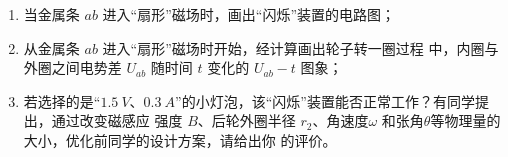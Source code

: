 \begin{enumerate}
\begin{enumerate}
\item 
当金属条 $ ab $ 进入“扇形”磁场时，画出“闪烁”装置的电路图；

\item 
从金属条 $ ab $ 进入“扇形”磁场时开始，经计算画出轮子转一圈过程
中，内圈与外圈之间电势差 $ U_{ab} $ 随时间 $ t $ 变化的 $ U_{ab}-t $ 图象；

\item 
若选择的是“$ 1.5 \ V $、$ 0.3 \ A $”的小灯泡，该“闪烁”装置能否正常工作？有同学提出，通过改变磁感应
强度 $ B $、后轮外圈半径 $ r_{2} $、角速度$ \omega $ 和张角$ \theta $等物理量的大小，优化前同学的设计方案，请给出你
的评价。

\end{enumerate}
\begin{figure}[h!]
\flushright

\end{figure}





\end{enumerate}
